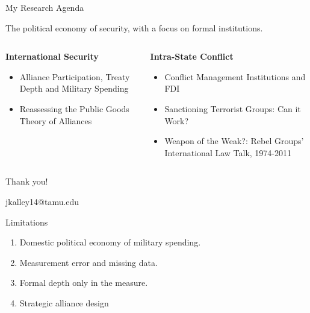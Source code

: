 \documentclass[12pt]{beamer}
\begin{document}
\begin{frame}{My Research Agenda}

The political economy of security, with a focus on formal institutions. 

\begin{columns}

\begin{column}{0.5\textwidth}
\textbf{International Security}
\begin{itemize} 
\item Alliance Participation, Treaty Depth and Military Spending 
\item Reassessing the Public Goods Theory of Alliances
\end{itemize} 
\end{column}



\begin{column}{0.5\textwidth}
\textbf{Intra-State Conflict}
\begin{itemize}
\item Conflict Management Institutions and FDI
\item Sanctioning Terrorist Groups: Can it Work?
\item Weapon of the Weak?: Rebel Groups' International Law Talk, 1974-2011
\end{itemize} 
\end{column}

\end{columns}
 

\end{frame}



 \begin{frame}[standout]

Thank you! 

jkalley14@tamu.edu

 \end{frame}



\appendix 



\begin{frame}{Limitations}

\begin{enumerate}
\item Domestic political economy of military spending. 
\item Measurement error and missing data. 
\item Formal depth only in the measure. 
\item Strategic alliance design
\end{enumerate}

\end{frame}
\end{document}
